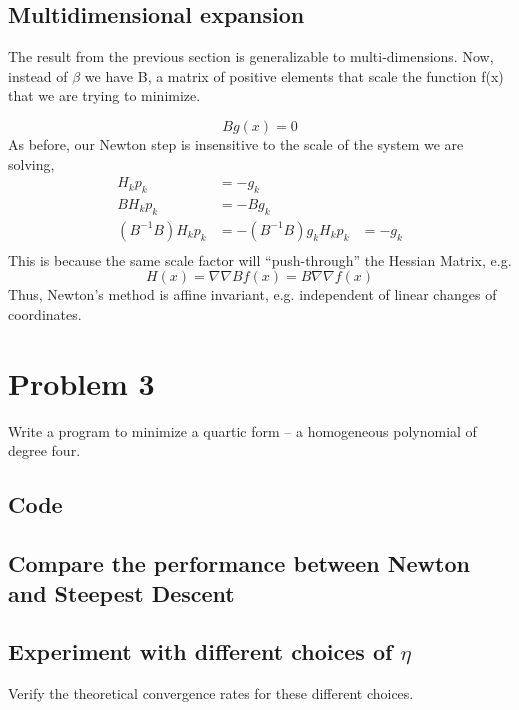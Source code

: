 \documentclass{article}
\begin{document}
\subsection{Multidimensional expansion}

The result from the previous section is generalizable to
multi-dimensions. Now, instead of $\beta$ we have B, a matrix of
positive elements that scale the function f(x) that we are trying to
minimize. 

\begin{equation}
 Bg(x) = 0
\end{equation}
As before, our Newton step is insensitive to the scale of the system we
are solving, 
\begin{align*}
 H_{k} p_{k}&=-g_{k}\\
 B H_{k} p_{k}&=- B g_{k}\\
 (B^{-1}B)H_{k} p_{k}&=-(B^{-1}B)g_{k}
 H_{k} p_{k}&=-g_{k}\\
\end{align*}
This is because the same scale factor will ``push-through'' the Hessian
Matrix, e.g. 
\begin{equation}
H(x) = \nabla\nabla B f(x) = B \nabla\nabla f(x) 
\end{equation}
Thus, Newton's method is affine invariant, e.g. independent of linear
changes of coordinates. 

\section{Problem 3}

Write a program to minimize a quartic form -- a homogeneous polynomial
of degree four. 

\subsection{Code}

\subsection{Compare the performance between Newton and Steepest Descent}

\subsection{Experiment with different choices of $\eta$}

Verify the theoretical convergence rates for these different choices. 
\end{document}
